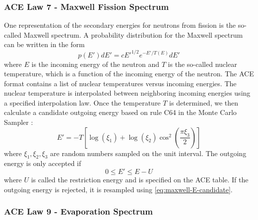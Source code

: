 \subsubsection{ACE Law 7 - Maxwell Fission Spectrum}
\label{sec:maxwell}

One representation of the secondary energies for neutrons from fission is the
so-called Maxwell spectrum. A probability distribution for the Maxwell spectrum
can be written in the form
\begin{equation}
  \label{eq:maxwell-spectrum}
  p(E') dE' = c E'^{1/2} e^{-E'/T(E)} dE'
\end{equation}
where $E$ is the incoming energy of the neutron and $T$ is the so-called nuclear
temperature, which is a function of the incoming energy of the neutron. The ACE
format contains a list of nuclear temperatures versus incoming energies. The
nuclear temperature is interpolated between neighboring incoming energies using
a specified interpolation law. Once the temperature $T$ is determined, we then
calculate a candidate outgoing energy based on rule C64 in the Monte Carlo
Sampler \cite{lanl-everett-1983}:
\begin{equation}
  \label{eq:maxwell-E-candidate}
  E' = -T \left [ \log (\xi_1) + \log (\xi_2) \cos^2 \left ( \frac{\pi
      \xi_3}{2} \right ) \right ]
\end{equation}
where $\xi_1, \xi_2, \xi_3$ are random numbers sampled on the unit
interval. The outgoing energy is only accepted if
\begin{equation}
  \label{eq:maxwell-restriction}
  0 \le E' \le E - U
\end{equation}
where $U$ is called the restriction energy and is specified on the ACE table. If
the outgoing energy is rejected, it is resampled using
\eqref{eq:maxwell-E-candidate}.

\subsubsection{ACE Law 9 - Evaporation Spectrum}

